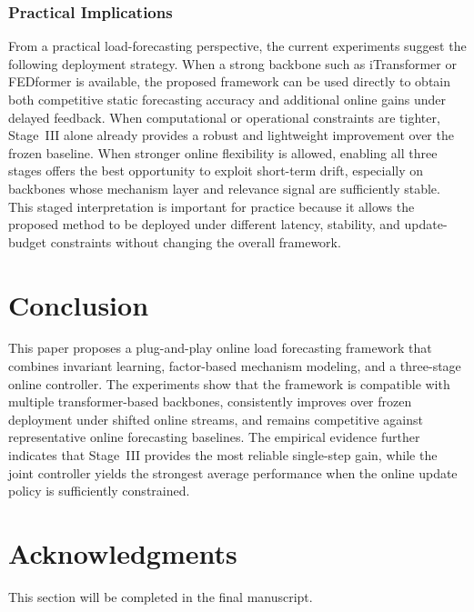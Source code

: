﻿\documentclass[journal]{IEEEtran}
\begin{document}
\subsubsection{Practical Implications}
From a practical load-forecasting perspective, the current experiments suggest the following deployment strategy. When a strong backbone such as iTransformer or FEDformer is available, the proposed framework can be used directly to obtain both competitive static forecasting accuracy and additional online gains under delayed feedback. When computational or operational constraints are tighter, Stage~III alone already provides a robust and lightweight improvement over the frozen baseline. When stronger online flexibility is allowed, enabling all three stages offers the best opportunity to exploit short-term drift, especially on backbones whose mechanism layer and relevance signal are sufficiently stable. This staged interpretation is important for practice because it allows the proposed method to be deployed under different latency, stability, and update-budget constraints without changing the overall framework.

\FloatBarrier
\balance
\section{Conclusion}
This paper proposes a plug-and-play online load forecasting framework that combines invariant learning, factor-based mechanism modeling, and a three-stage online controller. The experiments show that the framework is compatible with multiple transformer-based backbones, consistently improves over frozen deployment under shifted online streams, and remains competitive against representative online forecasting baselines. The empirical evidence further indicates that Stage~III provides the most reliable single-step gain, while the joint controller yields the strongest average performance when the online update policy is sufficiently constrained.

\section*{Acknowledgments}
This section will be completed in the final manuscript.
\end{document}
